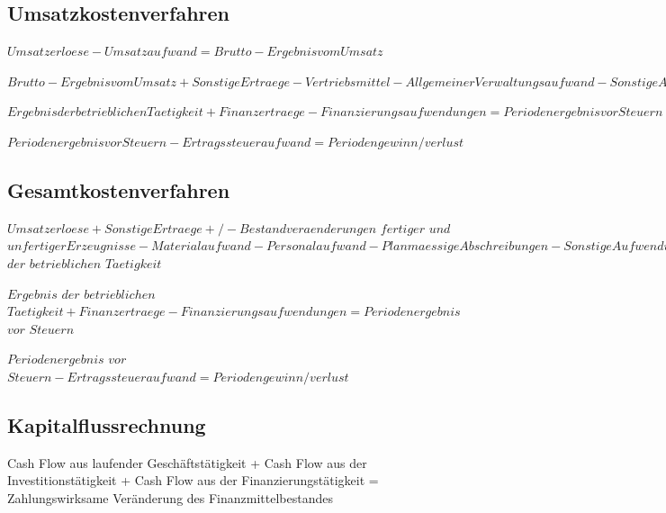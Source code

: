 \documentclass{article}
\begin{document}
\subsection{Umsatzkostenverfahren}

\begin{center}
$Umsatzerloese - Umsatzaufwand = Brutto-Ergebnis vom Umsatz$ 
\end{center}
\begin{center}
 $Brutto-Ergebnis vom Umsatz + Sonstige Ertraege - Vertriebsmittel - Allgemeiner Verwaltungsaufwand - Sonstige Aufwendungen = Ergebnis der betrieblichen Taetigkeit  $
\end{center}
\begin{center}
$ Ergebnis der betrieblichen Taetigkeit + Finanzertraege - Finanzierungsaufwendungen = Periodenergebnis vor Steuern $
\end{center}
\begin{center}
$ Periodenergebnis vor Steuern - Ertragssteueraufwand = Periodengewinn/verlust $
\end{center} 

\subsection{Gesamtkostenverfahren}
\begin{center}
$ Umsatzerloese + Sonstige Ertraege +/- Bestandveraenderungen$ $fertiger$ $und$ $unfertiger Erzeugnisse - Materialaufwand - Personalaufwand - Planmaessige Abschreibungen - Sonstige Aufwendungen = Ergebnis$ $der$ $betrieblichen$ $Taetigkeit  $
\end{center}
\begin{center}
$ Ergebnis$ $der$ $betrieblichen$ $Taetigkeit + Finanzertraege - Finanzierungsaufwendungen = Periodenergebnis$ $vor$ $Steuern $
\end{center}
\begin{center}
$ Periodenergebnis$ $vor$ $Steuern - Ertragssteueraufwand = Periodengewinn/verlust  $ 
\end{center}
 

\subsection{Kapitalflussrechnung}

Cash Flow aus laufender Geschäftstätigkeit
+ Cash Flow aus der Investitionstätigkeit
+ Cash Flow aus der Finanzierungstätigkeit
= Zahlungswirksame Veränderung des Finanzmittelbestandes
\end{document}
